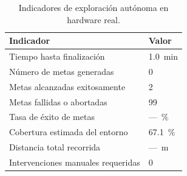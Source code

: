 \begin{table}[H]
\centering
\caption{Indicadores de exploración autónoma en hardware real.}
\label{tab:explore_real}
\begin{tabular}{ll}
\hline
\textbf{Indicador} & \textbf{Valor} \\
\hline
Tiempo hasta finalización          & 1.0~min \\
Número de metas generadas          & 0 \\
Metas alcanzadas exitosamente      & 2 \\
Metas fallidas o abortadas         & 99 \\
Tasa de éxito de metas             & ---~\% \\
Cobertura estimada del entorno     & 67.1~\% \\
Distancia total recorrida          & ---~m \\
Intervenciones manuales requeridas & 0 \\
\hline
\end{tabular}
\end{table}

